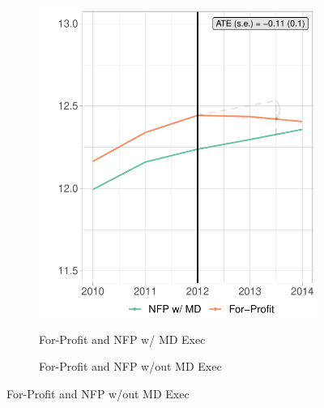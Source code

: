 \documentclass[12pt]{article}
\begin{document}
    \begin{figure}[ht!]
     \caption{Mortality Rate Synthetic Difference in Differences Results}
     \centering
     \begin{subfigure}[b]{0.45\textwidth}
         \centering
         \caption{For-Profit and NFP w/ MD Exec}
         \includegraphics[width=\textwidth]{Objects/mort_fp_md_synth_graph.pdf}
         \label{fig:mort_synth_plotb}
     \end{subfigure}%
     \hfill
     \begin{subfigure}[b]{0.45\textwidth}
         \centering
         \caption{For-Profit and NFP w/out MD Exec}

\end{subfigure}
\end{figure}
\end{document}
